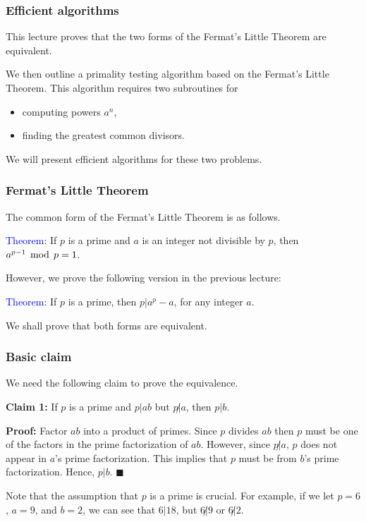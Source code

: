 

\begin{frame}\frametitle{Efficient algorithms}
  This lecture proves that the two forms of the Fermat's Little
  Theorem are equivalent.  

  We then outline a primality testing algorithm based on the Fermat's
  Little Theorem.  This algorithm requires two subroutines for
  \begin{itemize}
  \item computing powers $a^n$,
  \item finding the greatest common divisors.
  \end{itemize}
  We will present efficient algorithms for these two problems.
\end{frame}

\begin{frame}\frametitle{Fermat's Little Theorem}
  The common form of the Fermat's Little Theorem is as follows.

  \begin{tcolorbox}[title=First form]
    \textcolor{blue}{Theorem:} If $p$ is a prime and $a$ is an integer not divisible by $p$, then $a^{p-1}\,\bmod\, p = 1$.
  \end{tcolorbox}

  However, we prove the following version in the previous lecture:

  \begin{tcolorbox}[title=Second form]
    \textcolor{blue}{Theorem:} If $p$ is a prime, then $p|a^{p}-a$, for any integer $a$.
  \end{tcolorbox}

  We shall prove that both forms are equivalent.
\end{frame}

\begin{frame}\frametitle{Basic claim}
  We need the following claim to prove the equivalence.

  \begin{tcolorbox}
    {\bf Claim 1:} If $p$ is a prime and $p| ab$ but $p\not| a$, then
    $p|b$.
  \end{tcolorbox}
  
  {\bf Proof:} Factor $ab$ into a product of primes.  Since $p$
  divides $ab$ then $p$ must be one of the factors in the prime
  factorization of $ab$.  However, since $p\not|a$, $p$ does not
  appear in $a$'s prime factorization.  This implies that $p$ must be
  from $b$'s prime factorization.  Hence, $p|b$.  $\blacksquare$

  \vspace{0.2in}

  Note that the assumption that $p$ is a prime is crucial.  For
  example, if we let $p=6$, $a=9$, and $b=2$, we can see that $6|18$,
  but $6\not|9$ or $6\not|2$.
\end{frame}


